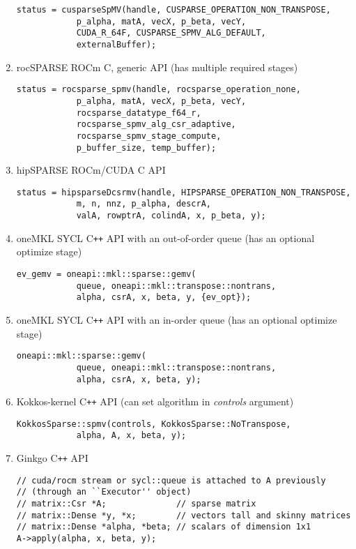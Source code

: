 \documentclass{article}
\newcommand{\cplusplus}{C\texttt{++}\xspace}
\begin{document}
\begin{enumerate}[label=(\arabic*)]
\begin{lstlisting}
status = cusparseSpMV(handle, CUSPARSE_OPERATION_NON_TRANSPOSE,
            p_alpha, matA, vecX, p_beta, vecY,
            CUDA_R_64F, CUSPARSE_SPMV_ALG_DEFAULT,
            externalBuffer);
\end{lstlisting}
\item rocSPARSE ROCm C, generic API (has multiple required stages)
\begin{lstlisting}
status = rocsparse_spmv(handle, rocsparse_operation_none,
            p_alpha, matA, vecX, p_beta, vecY,
            rocsparse_datatype_f64_r,
            rocsparse_spmv_alg_csr_adaptive,
            rocsparse_spmv_stage_compute,
            p_buffer_size, temp_buffer);
\end{lstlisting}
\item hipSPARSE ROCm/CUDA C API
\begin{lstlisting}
status = hipsparseDcsrmv(handle, HIPSPARSE_OPERATION_NON_TRANSPOSE,
            m, n, nnz, p_alpha, descrA,
            valA, rowptrA, colindA, x, p_beta, y);
\end{lstlisting}
\item oneMKL SYCL \cplusplus API with an out-of-order queue (has an optional optimize stage)
\begin{lstlisting}
ev_gemv = oneapi::mkl::sparse::gemv(
            queue, oneapi::mkl::transpose::nontrans,
            alpha, csrA, x, beta, y, {ev_opt});
\end{lstlisting}
\item oneMKL SYCL \cplusplus API with an in-order queue (has an optional optimize stage)
\begin{lstlisting}
oneapi::mkl::sparse::gemv(
            queue, oneapi::mkl::transpose::nontrans,
            alpha, csrA, x, beta, y);
\end{lstlisting}
\item Kokkos-kernel \cplusplus API (can set algorithm in \textit{controls} argument)
\begin{lstlisting}
KokkosSparse::spmv(controls, KokkosSparse::NoTranspose,
            alpha, A, x, beta, y);
\end{lstlisting}
\item Ginkgo \cplusplus API
\begin{lstlisting}
// cuda/rocm stream or sycl::queue is attached to A previously
// (through an ``Executor'' object)
// matrix::Csr *A;              // sparse matrix
// matrix::Dense *y, *x;        // vectors tall and skinny matrices
// matrix::Dense *alpha, *beta; // scalars of dimension 1x1
A->apply(alpha, x, beta, y);
\end{lstlisting}

\end{enumerate}
\end{document}
